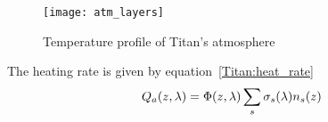\begin{figure}
\centering
\texttt{[image: atm\_layers]}
\caption{\label{T(z):Titan}Temperature profile of Titan's atmosphere}
\end{figure}

The heating rate is given by equation~\ref{Titan:heat_rate}
\begin{equation}
Q_a(z,\lambda) = \Phi(z,\lambda)\sum_s \sigma_s(\lambda)n_s(z)
\label{Titan:heat_rate}
\end{equation}
